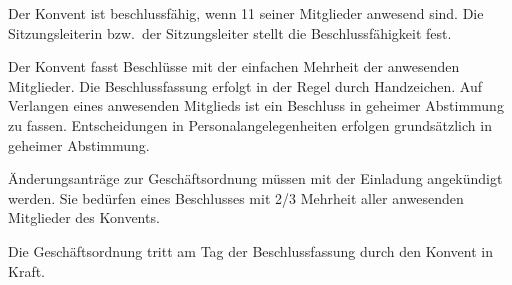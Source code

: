 \documentclass[a4paper, parskip=half, numbers=noenddot]{scrartcl}
\begin{document}
\begin{contract}
Der Konvent ist beschlussfähig, wenn 11 seiner Mitglieder anwesend sind. Die Sitzungsleiterin bzw.\ der Sitzungsleiter stellt die Beschlussfähigkeit fest.	

Der Konvent fasst Beschlüsse mit der einfachen Mehrheit der anwesenden Mitglieder. Die
Beschlussfassung erfolgt in der Regel durch Handzeichen. Auf Verlangen eines
anwesenden Mitglieds ist ein Beschluss in geheimer Abstimmung zu fassen. 
Entscheidungen in Personalangelegenheiten erfolgen grundsätzlich in geheimer Abstimmung.

Änderungsanträge zur Geschäftsordnung müssen mit der Einladung angekündigt werden. Sie
bedürfen eines Beschlusses mit 2/3 Mehrheit aller anwesenden Mitglieder des Konvents.

Die Geschäftsordnung tritt am Tag der Beschlussfassung durch den Konvent in Kraft.


\end{contract}
\end{document}
